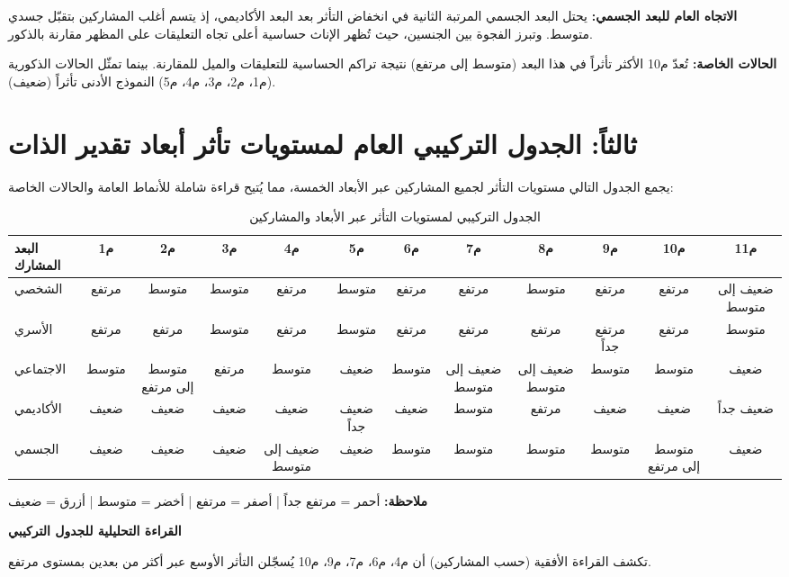 \documentclass[12pt,oneside]{report}
\begin{document}
\noindent\textbf{الاتجاه العام للبعد الجسمي:} يحتل البعد الجسمي المرتبة الثانية في انخفاض التأثر بعد البعد الأكاديمي، إذ يتسم أغلب المشاركين بتقبّل جسدي متوسط. وتبرز الفجوة بين الجنسين، حيث تُظهر الإناث حساسية أعلى تجاه التعليقات على المظهر مقارنة بالذكور.\par
\noindent\textbf{الحالات الخاصة:} تُعدّ م10 الأكثر تأثراً في هذا البعد (متوسط إلى مرتفع) نتيجة تراكم الحساسية للتعليقات والميل للمقارنة. بينما تمثّل الحالات الذكورية (م1، م2، م3، م4، م5) النموذج الأدنى تأثراً (ضعيف).\par
\section{ثالثاً: الجدول التركيبي العام لمستويات تأثر أبعاد تقدير الذات}
يجمع الجدول التالي مستويات التأثر لجميع المشاركين عبر الأبعاد الخمسة، مما يُتيح قراءة شاملة للأنماط العامة والحالات الخاصة:

\begin{table}[H]
\centering
\caption{الجدول التركيبي لمستويات التأثر عبر الأبعاد والمشاركين}
\scriptsize
\renewcommand{\arraystretch}{1.3}
\setlength{\tabcolsep}{4pt}
\begin{adjustbox}{max width=\textwidth}
\begin{tabular}{l c c c c c c c c c c c}
\toprule
\textbf{البعد المشارك} & \textbf{م1} & \textbf{م2} & \textbf{م3} & \textbf{م4} & \textbf{م5} & \textbf{م6} & \textbf{م7} & \textbf{م8} & \textbf{م9} & \textbf{م10} & \textbf{م11} \\
\midrule
الشخصي & مرتفع & متوسط & متوسط & مرتفع & متوسط & مرتفع & مرتفع & متوسط & مرتفع & مرتفع & ضعيف إلى متوسط \\
الأسري & مرتفع & مرتفع & متوسط & مرتفع & متوسط & مرتفع & مرتفع & مرتفع & مرتفع جداً & مرتفع & متوسط \\
الاجتماعي & متوسط & متوسط إلى مرتفع & مرتفع & متوسط & ضعيف & متوسط & ضعيف إلى متوسط & ضعيف إلى متوسط & متوسط & متوسط & ضعيف \\
الأكاديمي & ضعيف & ضعيف & ضعيف & ضعيف & ضعيف جداً & ضعيف & متوسط & مرتفع & ضعيف & ضعيف & ضعيف جداً \\
الجسمي & ضعيف & ضعيف & ضعيف & ضعيف إلى متوسط & ضعيف & متوسط & متوسط & متوسط & متوسط & متوسط إلى مرتفع & ضعيف \\
\bottomrule
\end{tabular}
\end{adjustbox}
\end{table}
\noindent\textbf{ملاحظة:}  أحمر = مرتفع جداً  |   أصفر = مرتفع  |   أخضر = متوسط  |   أزرق = ضعيف\par
\noindent\textbf{القراءة التحليلية للجدول التركيبي}\par
تكشف القراءة الأفقية (حسب المشاركين) أن م4، م6، م7، م9، م10 يُسجّلن التأثر الأوسع عبر أكثر من بعدين بمستوى مرتفع.
\end{document}
